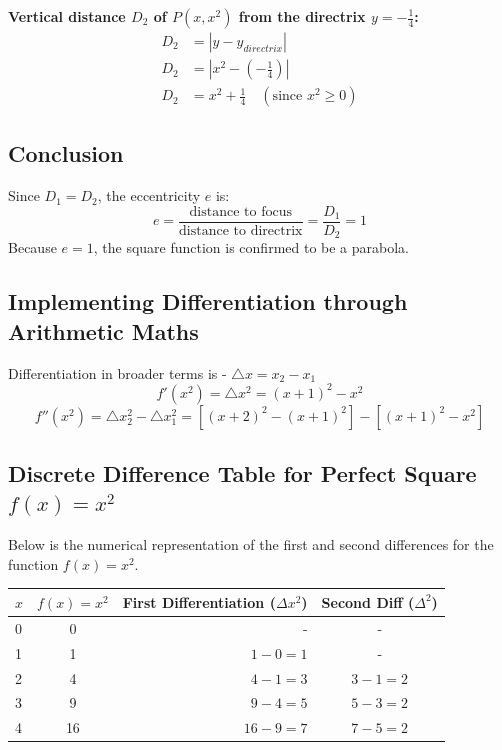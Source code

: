 \documentclass{article}
\begin{document}
\textbf{Vertical distance $D_2$ of $P(x, x^2)$ from the directrix $y = -\frac{1}{4}$:}
\begin{align*}
D_2 &= |y - y_{directrix}| \\
D_2 &= \left|x^2 - \left(-\frac{1}{4}\right)\right| \\
D_2 &= x^2 + \frac{1}{4} \quad (\text{since } x^2 \geq 0)
\end{align*}

\subsection*{Conclusion}
Since $D_1 = D_2$, the eccentricity $e$ is:
\[ e = \frac{\text{distance to focus}}{\text{distance to directrix}} = \frac{D_1}{D_2} = 1 \]
Because $e = 1$, the square function is confirmed to be a parabola.

\subsection{Implementing Differentiation through Arithmetic Maths}
Differentiation in broader terms is - $\triangle x = x_2 - x_1$
\begin{equation}
    f'(x^2) = \triangle x^2 = (x+1)^2 - x^2
\end{equation}
\begin{equation}
    f''(x^2) = \triangle x_2^2 - \triangle x_1^2 = [(x+2)^2 - (x+1)^2] - [(x+1)^2 - x^2]
\end{equation}
\subsection*{Discrete Difference Table for Perfect Square $f(x) = x^2$}
Below is the numerical representation of the first and second differences for the function $f(x) = x^2$.

\begin{table}[h]
\centering
\begin{tabular}{|l|c|r|c|}
\hline
$x$ & $f(x) = x^2$ & \textbf{First Differentiation} ($\Delta x^2$) & \textbf{Second Diff} 
($\Delta^2$) \\ \hline
0 & 0 & - & - \\ \hline
1 & 1 & $1-0 = 1$ & - \\ \hline
2 & 4 & $4-1 = 3$ & $3-1 = 2$ \\ \hline
3 & 9 & $9-4 = 5$ & $5-3 = 2$ \\ \hline
4 & 16 & $16-9 = 7$ & $7-5 = 2$ \\ \hline
\end{tabular}
\end{table}
\end{document}
